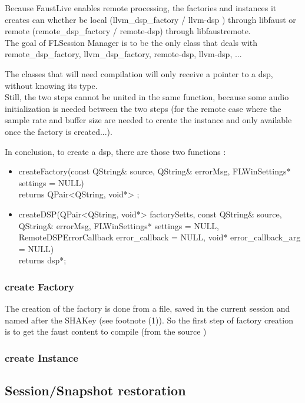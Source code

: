 \documentclass[a4paper]{article}
\begin{document}
Because FaustLive enables remote processing, the factories and instances it creates can whether be local (llvm\_dsp\_factory / llvm-dsp ) through libfaust or remote (remote\_dsp\_factory / remote-dsp) through libfaustremote. \\

The goal of FLSession Manager is to be the only class that deals with remote\_dsp\_factory, llvm\_dsp\_factory, remote-dsp, llvm-dsp, ...

The classes that will need compilation will only receive a pointer to a dsp, without knowing its type. \\

Still, the two steps cannot be united in the same function, because some audio initialization is needed between the two steps (for the remote case where the sample rate and buffer size are needed to create the instance and only available once the factory is created...).

In conclusion, to create a dsp, there are those two functions :
\begin{itemize}
\item createFactory(const QString\& source, QString\& errorMsg, FLWinSettings* settings = NULL) \\ returns QPair<QString, void*> ;
\item createDSP(QPair<QString, void*> factorySetts, const QString\& source, QString\& errorMsg, FLWinSettings* settings = NULL, RemoteDSPErrorCallback error\_callback = NULL, void* error\_callback\_arg = NULL) \\ returns dsp*;
\end{itemize}

\subsubsection{create Factory}

The creation of the factory is done from a file, saved in the current session and named after the SHAKey (see footnote (1)). So the first step of factory creation is to get the faust content to compile (from the source )


\subsubsection{create Instance}

\subsection{Session/Snapshot restoration}
\end{document}
